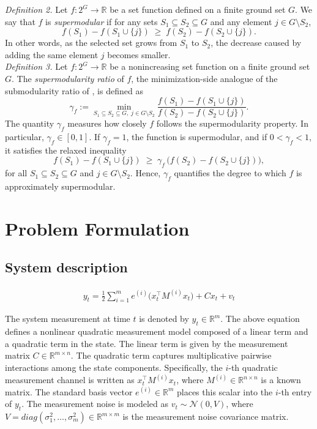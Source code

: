 \documentclass[letterpaper, 10 pt, conference]{ieeeconf}  %
\begin{document}
\noindent \textit{Definition 2.} 
Let \(f:2^G\to\mathbb R\) be a set function defined on a finite ground set \(G\).  
We say that \(f\) is \emph{supermodular} if for any sets \(S_1 \subseteq S_2 \subseteq G\) and any element \(j \in G \setminus S_2\),
\[
f(S_1)-f(S_1\cup\{j\})
\;\ge\;
f(S_2)-f(S_2\cup\{j\}).
\]
In other words, as the selected set grows from \(S_1\) to \(S_2\), the decrease caused by adding the same element \(j\) becomes smaller. \\

\noindent \textit{Definition 3.}
Let \(f:2^{G}\to\mathbb R\) be a nonincreasing set function on a finite ground set \(G\).
The \emph{supermodularity ratio} of \(f\), the minimization-side analogue of the submodularity ratio of \cite{c26}, is defined as
\[
\gamma_f
:=
\min_{S_1 \subseteq S_2 \subseteq G,\; j\in G\setminus S_2}
\frac{f(S_1)-f(S_1\cup\{j\})}
     {f(S_2)-f(S_2\cup\{j\})}.
\]
The quantity \(\gamma_f\) measures how closely \(f\) follows the supermodularity property. In particular, \(\gamma_f\in[0,1]\). If \(\gamma_f=1\), the function is supermodular, and if \(0<\gamma_f<1\), it satisfies the relaxed inequality
\[
f(S_1)-f(S_1\cup\{j\})
\;\ge\;
\gamma_f\,\bigl(f(S_2)-f(S_2 \cup\{j\})\bigr),
\]
for all \(S_1 \subseteq S_2 \subseteq G\) and \(j\in G\setminus S_2\). Hence, \(\gamma_f\) quantifies the degree to which \(f\) is approximately supermodular. \\

\section{Problem Formulation}

\subsection{System description}
\begin{equation}
\begin{aligned}
y_t = \frac{1}{2}\sum_{i=1}^m e^{(i)}\big(x_t^\top M^{(i)}x_t\big)+Cx_t + v_t 
\end{aligned}
\end{equation}

\vspace{2pt}

The system measurement at time \(t\) is denoted by \(y_t \in \mathbb{R}^{m}\). The above equation defines a nonlinear quadratic measurement model composed of a linear term and a quadratic term in the state. The linear term is given by the measurement matrix \(C \in \mathbb{R}^{m \times n}\). The quadratic term captures multiplicative pairwise interactions among the state components. Specifically, the \(i\)-th quadratic measurement channel is written as \(x_t^\top M^{(i)} x_t\), where \(M^{(i)} \in \mathbb{R}^{n \times n}\) is a known matrix. The standard basis vector \(e^{(i)} \in \mathbb{R}^m\) places this scalar into the \(i\)-th entry of \(y_t\). The measurement noise is modeled as \(v_t \sim \mathcal{N}(0,V)\), where \(V = diag(\sigma^2_1, \dots, \sigma^2_m ) \in \mathbb{R}^{m \times m}\) is the measurement noise covariance matrix.
\end{document}
